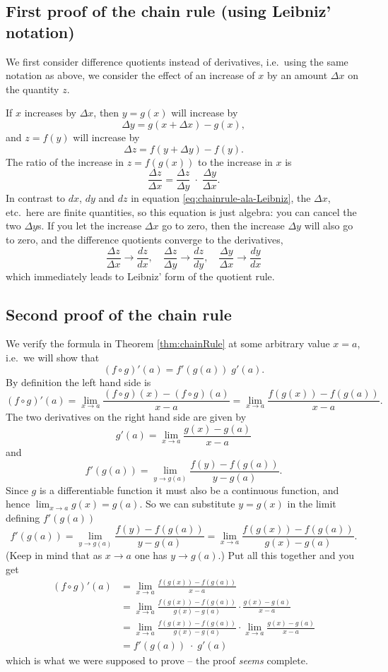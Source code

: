 \subsection{First proof of the chain rule (using Leibniz' notation)}

We first consider difference quotients instead of derivatives, i.e.\ using the
same notation as above, we consider the effect of an increase of $x$ by an
amount $\Delta x$ on the quantity $z$.

If $x$ increases by $\Delta x$, then $y=g(x)$ will increase by
\[
\Delta y = g(x+\Delta x) - g(x),
\]
and $z=f(y)$ will increase by
\[
\Delta z = f(y+\Delta y) -f(y).
\]
The ratio of the increase in $z=f(g(x))$ to the increase in $x$ is
\[
\frac{\Delta z}{\Delta x} = \frac{\Delta z}{\Delta y} \;\cdot\; \frac{\Delta
  y}{\Delta x}.
\]
In contrast to $dx$, $dy$ and $dz$ in equation \eqref{eq:chainrule-ala-Leibniz},
the $\Delta x$, etc.\ here are finite quantities, so this equation is just
algebra: you can cancel the two $\Delta y$s.  If you let the increase $\Delta x$
go to zero, then the increase $\Delta y$ will also go to zero, and the
difference quotients converge to the derivatives,
\[
\frac{\Delta z}{\Delta x} \longrightarrow \frac{dz}{dx},\quad \frac{\Delta
  z}{\Delta y} \longrightarrow \frac{dz}{dy},\quad \frac{\Delta y}{\Delta x}
\longrightarrow \frac{dy}{dx}
\]
which immediately leads to Leibniz' form of the quotient rule.

\subsection{Second proof of the chain rule}
We verify the formula in Theorem \ref{thm:chainRule} at some arbitrary value
$x=a$, i.e.\ we will show that
\[
(f\circ g)'(a) = f'(g(a))\;g'(a).
\]
By definition the left hand side is
\[
(f\circ g)'(a) = \lim_{x\to a}\frac{(f\circ g)(x)-(f\circ g)(a)}{x-a} =
\lim_{x\to a}\frac{f(g(x))-f(g(a))}{x-a}.
\]
The two derivatives on the right hand side are given by
\[
g'(a) = \lim_{x\to a} \frac {g(x)- g(a)}{x-a}
\]
and
\[
f'(g(a)) = \lim_{y\to g(a)} \frac{f(y) - f(g(a))}{y-g(a)}.
\]
Since $g$ is a differentiable function it must also be a continuous function,
and hence $\lim_{x\to a} g(x) = g(a)$.  So we can substitute $y=g(x)$ in the
limit defining $f'(g(a))$
\begin{equation}
  f'(g(a)) = \lim_{y\to g(a)} \frac{f(y) - f(g(a))}{y-g(a)} 
  =\lim_{x\to a} \frac{f(g(x))-f(g(a))}{g(x)-g(a)}.  
\end{equation}
(Keep in mind that as $x\to a$ one has $y\to g(a)$.)  Put all this together and
you get
\begin{align*}
  (f\circ g)'(a)
  &= \lim_{x\to a}\frac{f(g(x))-f(g(a))}{x-a}\\
  &= \lim_{x\to a}
  \frac{f(g(x))-f(g(a))}{g(x)-g(a)}\cdot\frac{g(x)-g(a)}{x-a}\\
  &= \lim_{x\to a} \frac{f(g(x))-f(g(a))}{g(x)-g(a)}
  \cdot\lim_{x\to a}\frac{g(x)-g(a)}{x-a}\\
  &=f'(g(a)) \;\cdot\;g'(a)
\end{align*}
which is what we were supposed to prove -- the proof \textit{seems} complete.


